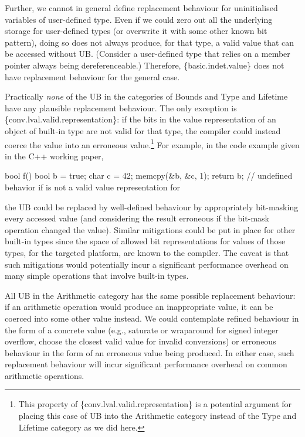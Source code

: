 Further, we cannot in general define replacement behaviour for uninitialised variables of user-defined type. Even if we could zero out all the underlying storage for user-defined types (or overwrite it with some other known bit pattern), doing so does not always produce, for that type, a valid value that can be accessed without UB. (Consider a user-defined type that relies on a member pointer always being dereferenceable.) Therefore, \{basic.indet.value\} does not have replacement behaviour for the general case.

Practically \emph{none} of the UB in the categories of Bounds and Type and Lifetime have any plausible replacement behaviour. The only exception is \{conv.lval.valid.representation\}: if the bits in the value representation of an object of built-in type are not valid for that type, the compiler could instead coerce the value into an erroneous value.\footnote{This property of \{conv.lval.valid.representation\} is a potential argument for placing this case of UB into the Arithmetic category instead of the Type and Lifetime category as we did here.} For example, in the code example given in the C++ working paper,

\begin{codeblock}
bool f() {
  bool b = true;
  char c = 42;
  memcpy(&b, &c, 1);
  return b;         // undefined behavior if  is not a valid value representation for 
}
\end{codeblock}

the UB could be replaced by well-defined behaviour by appropriately bit-masking every accessed  value (and considering the result erroneous if the bit-mask operation changed the value). Similar mitigations could be put in place for other built-in types since the space of allowed bit representations for values of those types, for the targeted platform, are known to the compiler. The caveat is that such mitigations would potentially incur a significant performance overhead on many simple operations that involve built-in types.

All UB in the Arithmetic category has the same possible replacement behaviour: if an arithmetic operation would produce an inappropriate value, it can be coerced into some other value instead. We could contemplate refined behaviour in the form of a concrete value (e.g., saturate or wraparound for signed integer overflow, choose the closest valid value for invalid conversions) or erroneous behaviour in the form of an erroneous value being produced. In either case, such replacement behaviour will incur significant performance overhead on common arithmetic operations.

